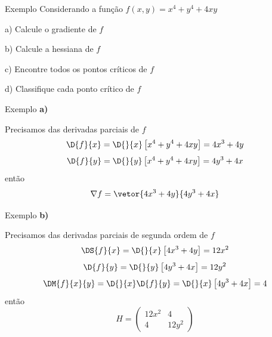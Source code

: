 \addtocounter{exemplo}{1}
\begin{frame}{Exemplo \theexemplo}
  Considerando a função
  \(
    f(x, y) = x^4 + y^4 + 4xy
  \)

  a) Calcule o gradiente de $f$

  b) Calcule a hessiana de $f$

  c) Encontre todos os pontos críticos de $f$

  d) Classifique cada ponto crítico de $f$
\end{frame}

\begin{frame}{Exemplo \theexemplo}
  \noindent\textbf{a)}

  Precisamos das derivadas parciais de $f$
  \[
  \D{f}{x}
  = \D{}{x}\left[x^4 + y^4 + 4xy\right]
  = 4x^3 + 4y
  \]
  \[
  \D{f}{y}
  = \D{}{y}\left[x^4 + y^4 + 4xy\right]
  = 4y^3 + 4x
  \]
  então
  \[
  \nabla f = \vetor{4x^3 + 4y}{4y^3 + 4x}
  \]
\end{frame}

\begin{frame}{Exemplo \theexemplo}
  \noindent\textbf{b)}

  Precisamos das derivadas parciais de segunda ordem de $f$
  \[
  \DS{f}{x}
  = \D{}{x}\left[4x^3 + 4y\right]
  = 12x^2
  \]
  \[
  \D{f}{y}
  = \D{}{y}\left[4y^3 + 4x\right]
  = 12y^2
  \]
  \[
  \DM{f}{x}{y}
  = \D{}{x}\D{f}{y}
  = \D{}{x}\left[4y^3 + 4x\right]
  = 4
  \]
  então
  \[
  H = \left(\begin{array}{cc}
    12x^2 & 4 \\
    4 & 12y^2
  \end{array}\right)
  \]
\end{frame}

